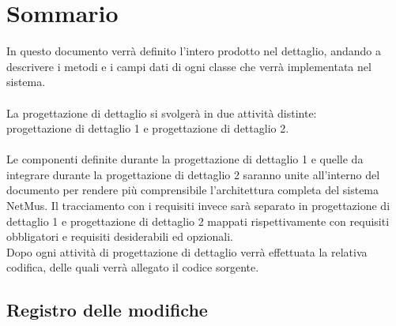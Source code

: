 \newcommand{\nomedoc}{Definizione Del Prodotto}
\newcommand{\versione}{2.0}
\newcommand{\versioneglossario}{4.0}
\newcommand{\versioneAR}{3.0}
\newcommand{\versionenormeprogetto}{4.0}
\newcommand{\versionespecifica}{3.0}
\newcommand{\nomefile}{DefinizioneDelProdotto-\versione.pdf}
\newcommand{\datacreazione}{3 Febbraio 2011}
\newcommand{\datamodifica}{14 Marzo 2011}
\newcommand{\stato}{formale}
\newcommand{\uso}{esterno}
\newcommand{\redazione}{Lovato Daniele, Daminato Simone}
\newcommand{\verifica}{Palazzin Alberto}
\newcommand{\approvazione}{Mandolo Andrea}
\newcommand{\distribuzione}{
VT.G \\
& Prof. Vardanega Tullio\\
& Prof. Cardin Riccardo }


\usepackage{amsfonts}





\chapter*{Sommario}
\thispagestyle{fancy}
In questo documento verr\`a definito l'intero prodotto nel dettaglio, andando a
descrivere i metodi e i campi dati di ogni classe che verr\`a implementata nel
sistema.\\\\
La progettazione di dettaglio si svolger\`a in due attivit\`a distinte:\\
progettazione di dettaglio 1 e progettazione di dettaglio 2.\\\\
Le componenti definite durante la progettazione di dettaglio 1 e quelle
da integrare durante la progettazione di dettaglio 2 saranno unite all'interno
del documento per rendere pi\`u comprensibile l'architettura completa del sistema
NetMus. Il tracciamento con i requisiti invece sar\`a separato in progettazione
di dettaglio 1 e progettazione di dettaglio 2 mappati rispettivamente con
requisiti obbligatori e requisiti desiderabili ed opzionali.\\
Dopo ogni attivit\`a di progettazione di dettaglio verr\`a effettuata la
relativa codifica, delle quali verr\`a allegato il codice sorgente.

\newpage
\section*{Registro delle modifiche}

